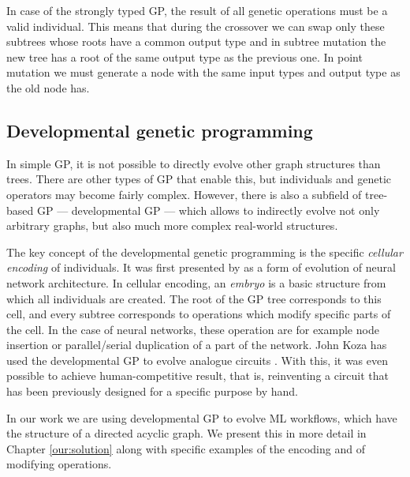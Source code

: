 In case of the strongly typed GP, the result of all genetic operations must
be a valid individual. This means that during the crossover we can swap only
these subtrees whose roots have a common output type and in subtree mutation
the new tree has a root of the same output type as the previous one. In point
mutation we must generate a node with the same input types and output type as
the old node has.
\citep{Poli:2008:FGG:1796422}

\subsection{Developmental genetic programming} \label{devGP}
In simple GP, it is not possible to directly evolve other graph structures
than trees. There are other types of GP that enable this, but individuals
and genetic operators may become fairly complex. However, there is also a
subfield of tree-based GP --- developmental GP --- which allows to indirectly
evolve not only arbitrary graphs, but also much more complex real-world
structures.

The key concept of the developmental genetic programming is the
specific \emph{cellular encoding} of individuals. It was first presented by
\cite{Gruau:1994:thesis} as a form of evolution of neural network architecture.
In cellular encoding, an \emph{embryo} is a basic structure from which all
individuals are created.
The root of the GP tree corresponds to this cell, and every subtree corresponds
to operations which modify specific parts of the cell. In the case of neural
networks, these operation are for example node insertion or parallel/serial
duplication of a part of the network. John Koza has used the developmental GP
to evolve analogue circuits \citep{Koza:1998:circuits}. With this, it was even
possible to achieve human-competitive result, that is, reinventing a circuit
that has been previously designed for a specific purpose by hand.

In our work we are using developmental GP to evolve ML workflows, which have
the structure of a directed acyclic graph. We present this in more detail in
Chapter \ref{our:solution} along with specific examples of the encoding and
of modifying operations.
